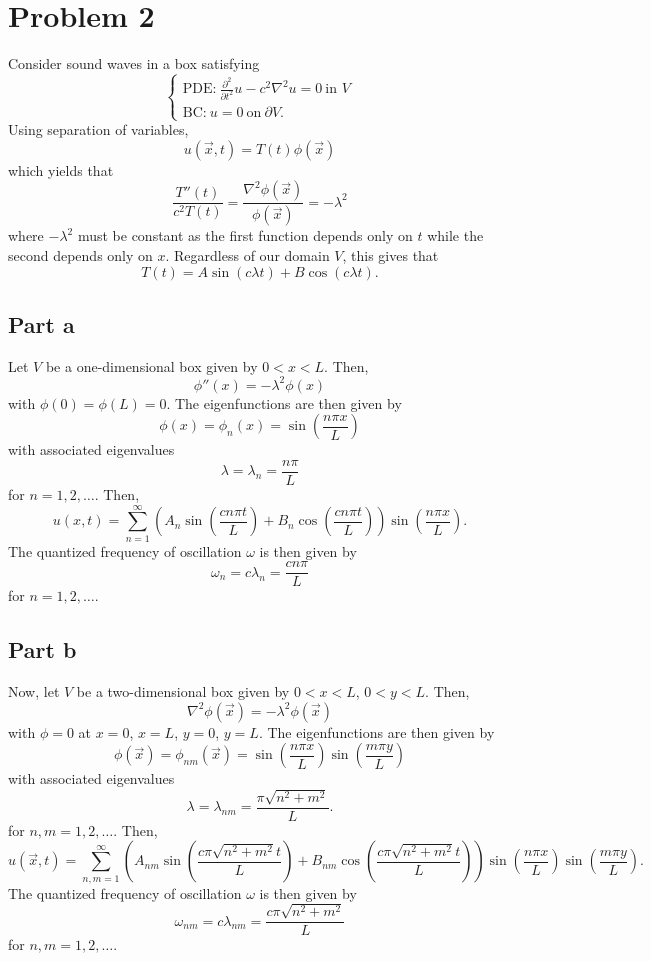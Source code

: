 \documentclass{article}
\begin{document}
\section{Problem 2}
Consider sound waves in a box satisfying 
\begin{equation*}
	\begin{cases}
		\text{PDE:}\ \frac{\partial^2}{\partial t^2}u - c^2 \nabla^2 u = 0 \ \text{in } V\\
		\text{BC:}\ u = 0 \ \text{on} \ \partial V.
	\end{cases}
\end{equation*}
Using separation of variables, 
\[
u(\vec x,t)=T(t)\phi(\vec x)
\]
which yields that 
\[
\frac{T''(t)}{c^2T(t)}=\frac{\nabla^2\phi(\vec x)}{\phi(\vec x)}=-\lambda^2
\]
where $-\lambda^2$ must be constant as the first function depends only on $t$ while the second depends only on $x$. Regardless of our domain $V$, this gives that
\[
T(t)=A\sin(c\lambda t)+B\cos(c\lambda t).
\]

\subsection{Part a}
Let $V$ be a one-dimensional box given by $0<x<L$. Then, 
\[
\phi''(x)=-\lambda^2\phi(x)
\]
with $\phi(0)=\phi(L)=0$. The eigenfunctions are then given by
\[
\phi(x)=\phi_n(x)=\sin\left(\frac{n\pi x}{L}\right)
\]
with associated eigenvalues
\[
\lambda=\lambda_n=\frac{n\pi}{L}
\]
for $n=1,2,\ldots$. Then,
\[
u(x,t)=\sum_{n=1}^\infty\left(A_n\sin\left(\frac{cn\pi t}{L}\right)+B_n\cos\left(\frac{cn\pi t}{L}\right)\right)\sin\left(\frac{n\pi x}{L}\right).
\]
The quantized frequency of oscillation $\omega$ is then given by 
\[
\omega_n=c\lambda_n=\frac{cn\pi}{L}
\]
for $n=1,2,\ldots$. 

\subsection{Part b}
Now, let $V$ be a two-dimensional box given by $0<x<L$, $0<y<L$. Then, 
\[
\nabla^2\phi(\vec x)=-\lambda^2\phi(\vec x)
\]
with $\phi=0$ at $x=0$, $x=L$, $y=0$, $y=L$. The eigenfunctions are then given by
\[
\phi(\vec x)=\phi_{nm}(\vec x)=\sin\left(\frac{n\pi x}{L}\right)\sin\left(\frac{m\pi y}{L}\right)
\]
with associated eigenvalues
\[
\lambda=\lambda_{nm}=\frac{\pi\sqrt{n^2+m^2}}{L}.
\]
for $n,m=1,2,\ldots$.
Then,
\[
u(\vec x,t)=\sum_{n,m=1}^\infty\left(A_{nm}\sin\left(\frac{c\pi\sqrt{n^2+m^2}t}{L}\right)+B_{nm}\cos\left(\frac{c\pi\sqrt{n^2+m^2}t}{L}\right)\right)\sin\left(\frac{n\pi x}{L}\right)\sin\left(\frac{m\pi y}{L}\right).
\]
The quantized frequency of oscillation $\omega$ is then given by 
\[
\omega_{nm}=c\lambda_{nm}=\frac{c\pi\sqrt{n^2+m^2}}{L}
\]
for $n,m=1,2,\ldots$. 
\end{document}

